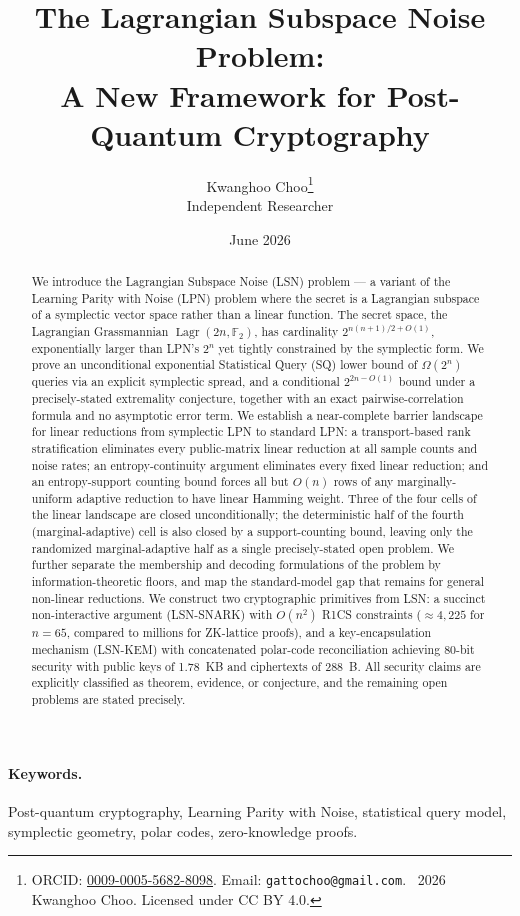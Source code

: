 \documentclass[11pt,a4paper]{article}
\title{The Lagrangian Subspace Noise Problem: \\ A New Framework for Post-Quantum Cryptography}
\author{Kwanghoo Choo\thanks{ORCID: \href{https://orcid.org/0009-0005-5682-8098}{0009-0005-5682-8098}. Email: \texttt{gattochoo@gmail.com}. \textcopyright~2026 Kwanghoo Choo. Licensed under CC BY 4.0.}\\ \normalsize Independent Researcher}
\date{June 2026}
\theoremstyle{plain}
\theoremstyle{definition}
\newcommand{\F}{\mathbb{F}}
\DeclareMathOperator{\Lagr}{Lagr}
\begin{document}
\maketitle

\begin{abstract}
We introduce the Lagrangian Subspace Noise (LSN) problem --- a variant of the Learning Parity with Noise (LPN) problem where the secret is a Lagrangian subspace of a symplectic vector space rather than a linear function. The secret space, the Lagrangian Grassmannian $\Lagr(2n,\F_2)$, has cardinality $2^{n(n+1)/2+O(1)}$, exponentially larger than LPN's $2^n$ yet tightly constrained by the symplectic form. We prove an unconditional exponential Statistical Query (SQ) lower bound of $\Omega(2^n)$ queries via an explicit symplectic spread, and a conditional $2^{2n-O(1)}$ bound under a precisely-stated extremality conjecture, together with an exact pairwise-correlation formula and no asymptotic error term. We establish a near-complete barrier landscape for linear reductions from symplectic LPN to standard LPN: a transport-based rank stratification eliminates every public-matrix linear reduction at all sample counts and noise rates; an entropy-continuity argument eliminates every fixed linear reduction; and an entropy-support counting bound forces all but $O(n)$ rows of any marginally-uniform adaptive reduction to have linear Hamming weight. Three of the four cells of the linear landscape are closed unconditionally; the deterministic half of the fourth (marginal-adaptive) cell is also closed by a support-counting bound, leaving only the randomized marginal-adaptive half as a single precisely-stated open problem. We further separate the membership and decoding formulations of the problem by information-theoretic floors, and map the standard-model gap that remains for general non-linear reductions. We construct two cryptographic primitives from LSN: a succinct non-interactive argument (LSN-SNARK) with $O(n^2)$ R1CS constraints ($\approx 4{,}225$ for $n=65$, compared to millions for ZK-lattice proofs), and a key-encapsulation mechanism (LSN-KEM) with concatenated polar-code reconciliation achieving 80-bit security with public keys of 1.78~KB and ciphertexts of 288~B. All security claims are explicitly classified as theorem, evidence, or conjecture, and the remaining open problems are stated precisely.
\end{abstract}

\paragraph{\textbf{Keywords.}} Post-quantum cryptography, Learning Parity with Noise, statistical query model, symplectic geometry, polar codes, zero-knowledge proofs.
\end{document}

